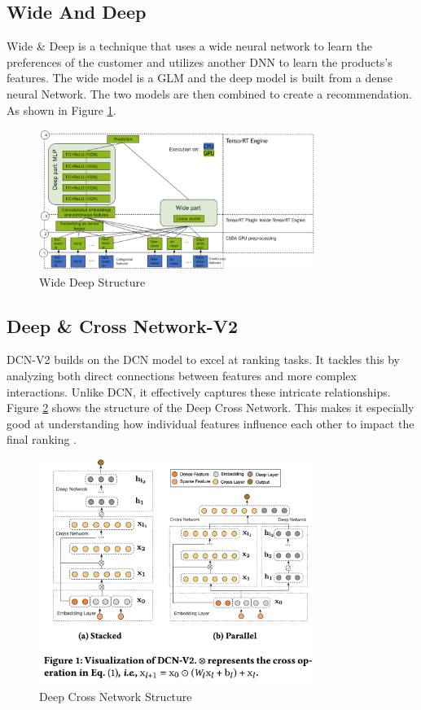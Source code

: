 \subsection{Wide And Deep}
Wide \& Deep is a technique that uses a wide neural network to learn the preferences of the customer and utilizes another DNN to learn the products's features. The wide model is a GLM and the deep model is built from a dense neural Network. The two models are then combined to create a recommendation. As shown in Figure \ref{fig:wide-deep}.
\begin{figure}[H]
    \centering
    \includegraphics[width=0.8\textwidth]{assets/wide_deep.png}
    \caption[Wide Deep Structure]{Wide Deep Structure \cite{NvidiaRecSys}}
    \label{fig:wide-deep}
\end{figure}
\subsection{Deep \& Cross Network-V2}
DCN-V2 builds on the DCN model to excel at ranking tasks. It tackles this by analyzing both direct connections between features and more complex interactions. Unlike DCN, it effectively captures these intricate relationships. Figure \ref{fig:deep-cross-network} shows the structure of the Deep Cross Network. This makes it especially good at understanding how individual features influence each other to impact the final ranking \cite{DCNv2}.
\begin{figure}[H]
    \centering
    \includegraphics[width=0.8\textwidth]{assets/dcn-v2.png}
    \caption[Deep Cross Network Structure]{Deep Cross Network Structure \cite{DCNv2}}
    \label{fig:deep-cross-network}
\end{figure}

